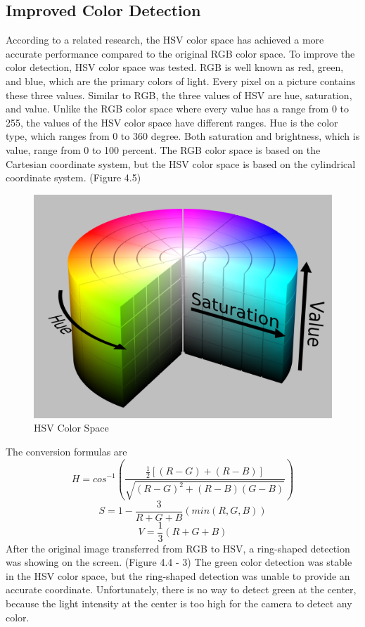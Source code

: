 \subsection{Improved Color Detection}

According to a related research, the HSV color space has achieved a more accurate performance compared to the original RGB color space. \cite{kaur2013content} To improve the color detection, HSV color space was tested. RGB is well known as red, green, and blue, which are the primary colors of light. Every pixel on a picture contains these three values. Similar to RGB, the three values of HSV are hue, saturation, and value. Unlike the RGB color space where every value has a range from 0 to 255, the values of the HSV color space have different ranges. Hue is the color type, which ranges from 0 to 360 degree. Both saturation and brightness, which is value, range from 0 to 100 percent. The RGB color space is based on the Cartesian coordinate system, but the HSV color space is based on the cylindrical coordinate system. (Figure 4.5)
\begin{figure}[ht!]
\begin{center}
\includegraphics[scale = 0.2]{pics/HSV.png}
\caption{HSV Color Space}
\end{center}
\end{figure}

The conversion formulas are
\begin{equation}
H = cos^{-1}(\frac{\frac{1}{2}[(R-G)+(R-B)]}{\sqrt{(R-G)^{2}+(R-B)(G-B)}})
\end{equation}
\begin{equation}
S = 1-\frac{3}{R+G+B}(min(R,G,B))
\end{equation}
\begin{equation}
V = \frac{1}{3}(R+G+B)
\end{equation}
After the original image transferred from RGB to HSV, a ring-shaped detection was showing on the screen. (Figure 4.4 - 3) The green color detection was stable in the HSV color space, but the ring-shaped detection was unable to provide an accurate coordinate. Unfortunately, there is no way to detect green at the center, because the light intensity at the center is too high for the camera to detect any color.
